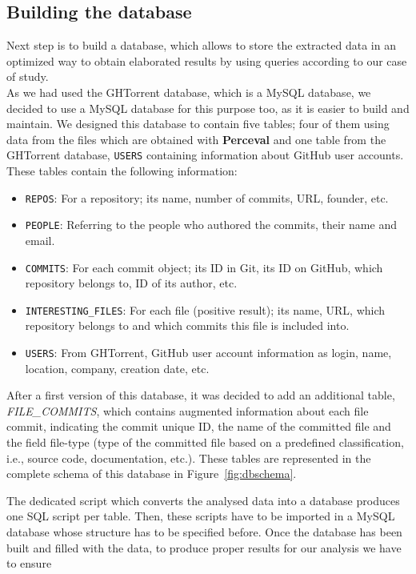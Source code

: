 \documentclass[a4paper, 12pt]{book}
\begin{document}
\subsection{Building the database}
\label{ssec:build-database}
Next step is to build a database, which allows to store the extracted data in an optimized way to
obtain elaborated results by using queries according to our case of study.\\
As we had used the GHTorrent database, which is a MySQL database, we decided to use a MySQL database
for this purpose too, as it is easier to build and maintain.
We designed this database to contain five tables; four of them using data from the files which are obtained with
\textbf{Perceval} and one table from the GHTorrent database, \texttt{USERS} containing information about GitHub user accounts.
These tables contain the following information:
\begin{itemize}
  \item \texttt{REPOS}: For a repository; its name, number of commits, URL, founder, etc.
  \item \texttt{PEOPLE}: Referring to the people who authored the commits, their name and email.
  \item \texttt{COMMITS}: For each commit object; its ID in Git, its ID on GitHub, which repository belongs to, ID of its author, etc.
  \item \texttt{INTERESTING\_FILES}: For each file (positive result); its name, URL, which repository belongs to and which commits this file is included into.
  \item \texttt{USERS}: From GHTorrent, GitHub user account information as login, name, location, company, creation date, etc.
\end{itemize}
After a first version of this database, it was decided to add an additional table, \textit{FILE\_COMMITS},
which contains augmented information about each file commit, indicating the commit unique ID, the name of the committed file and the field
file-type (type of the committed file based on a predefined classification, i.e., source code, documentation, etc.).
These tables are represented in the complete schema of this database in Figure~\ref{fig:dbschema}.\par
The dedicated script which converts the analysed data into a database produces one SQL script per table. Then, these
scripts have to be imported in a MySQL database whose structure has to be specified before.
Once the database has been built and filled with the data, to produce proper results for our analysis we have to ensure
\end{document}
